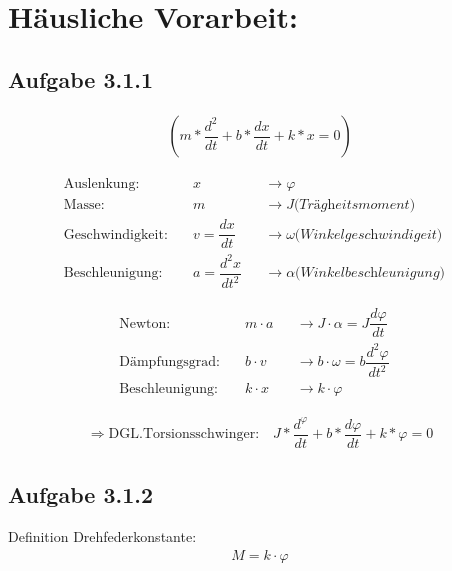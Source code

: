 \documentclass[a4paper]{scrartcl}
\def\header#1#2{
  \begin{center}
    {\Large #1}\\
    {#2}
  \end{center}
}
\numberwithin{equation}{subsection}
\begin{document}
\vspace{10pt}
\header{\HEADDING}{\SUBHEADDING}

\tableofcontents

\section{Häusliche Vorarbeit:}
\subsection{Aufgabe 3.1.1}

\begin{align}
(m*\dfrac{d^2}{dt} + b*\dfrac{dx}{dt} + k*x = 0)
\end{align}

\begin{align*}
\text{Auslenkung:}& \quad x 							&&\longrightarrow \varphi \\
\text{Masse:}& \quad m   							&&\longrightarrow J \textit{(Trägheitsmoment)} &\\
\text{Geschwindigkeit:}& \quad v=\dfrac{dx}{dt} 		&&\longrightarrow \omega \textit{(Winkelgeschwindigeit)}&\\
\text{Beschleunigung:}& \quad a=\dfrac{d^2x}{dt^2} 	&&\longrightarrow \alpha \textit{(Winkelbeschleunigung)}&
\end{align*}

\begin{align*}
\text{Newton:}& \quad m \cdot a  		&&\longrightarrow J \cdot \alpha = J \dfrac{d\varphi}{dt} &\\
\text{Dämpfungsgrad:}& \quad b \cdot v  	&&\longrightarrow b \cdot \omega = b \dfrac{d^2\varphi}{dt^2} &\\
\text{Beschleunigung:}& \quad k \cdot x 	&&\longrightarrow k \cdot \varphi &
\end{align*}

\begin{align}
\Rightarrow \text{DGL.Torsionsschwinger:} \quad J*\dfrac{d^\varphi}{dt} + b*\dfrac{d\varphi}{dt} + k*\varphi = 0
\end{align}

\subsection{Aufgabe 3.1.2}

Definition Drehfederkonstante:
\begin{align}
M = k \cdot \varphi
\end{align}
\end{document}

